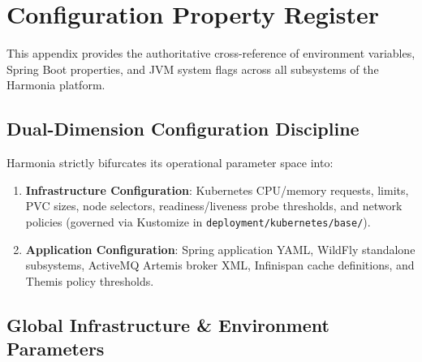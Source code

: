 
\chapter{Configuration Property Register}
\label{app:config_register}

This appendix provides the authoritative cross-reference of environment variables, Spring Boot properties, and JVM system flags across all subsystems of the Harmonia platform.

\section{Dual-Dimension Configuration Discipline}

Harmonia strictly bifurcates its operational parameter space into:
\begin{enumerate}
    \item \textbf{Infrastructure Configuration}: Kubernetes CPU/memory requests, limits, PVC sizes, node selectors, readiness/liveness probe thresholds, and network policies (governed via Kustomize in \nolinkurl{deployment/kubernetes/base/}).
    \item \textbf{Application Configuration}: Spring application YAML, WildFly standalone subsystems, ActiveMQ Artemis broker XML, Infinispan cache definitions, and Themis policy thresholds.
\end{enumerate}

\section{Global Infrastructure \& Environment Parameters}

